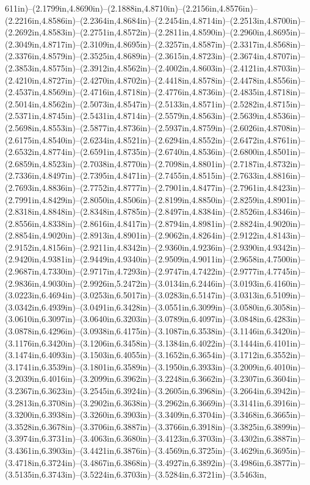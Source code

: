 611in)--(2.1799in,4.8690in)--(2.1888in,4.8710in)--(2.2156in,4.8576in)--(2.2216in,4.8586in)--(2.2364in,4.8684in)--(2.2454in,4.8714in)--(2.2513in,4.8700in)--(2.2692in,4.8583in)--(2.2751in,4.8572in)--(2.2811in,4.8590in)--(2.2960in,4.8695in)--(2.3049in,4.8717in)--(2.3109in,4.8695in)--(2.3257in,4.8587in)--(2.3317in,4.8568in)--(2.3376in,4.8579in)--(2.3525in,4.8689in)--(2.3615in,4.8723in)--(2.3674in,4.8707in)--(2.3853in,4.8575in)--(2.3912in,4.8562in)--(2.4002in,4.8603in)--(2.4121in,4.8703in)--(2.4210in,4.8727in)--(2.4270in,4.8702in)--(2.4418in,4.8578in)--(2.4478in,4.8556in)--(2.4537in,4.8569in)--(2.4716in,4.8718in)--(2.4776in,4.8736in)--(2.4835in,4.8718in)--(2.5014in,4.8562in)--(2.5073in,4.8547in)--(2.5133in,4.8571in)--(2.5282in,4.8715in)--(2.5371in,4.8745in)--(2.5431in,4.8714in)--(2.5579in,4.8563in)--(2.5639in,4.8536in)--(2.5698in,4.8553in)--(2.5877in,4.8736in)--(2.5937in,4.8759in)--(2.6026in,4.8708in)--(2.6175in,4.8540in)--(2.6234in,4.8521in)--(2.6294in,4.8552in)--(2.6472in,4.8761in)--(2.6532in,4.8774in)--(2.6591in,4.8735in)--(2.6740in,4.8536in)--(2.6800in,4.8501in)--(2.6859in,4.8523in)--(2.7038in,4.8770in)--(2.7098in,4.8801in)--(2.7187in,4.8732in)--(2.7336in,4.8497in)--(2.7395in,4.8471in)--(2.7455in,4.8515in)--(2.7633in,4.8816in)--(2.7693in,4.8836in)--(2.7752in,4.8777in)--(2.7901in,4.8477in)--(2.7961in,4.8423in)--(2.7991in,4.8429in)--(2.8050in,4.8506in)--(2.8199in,4.8850in)--(2.8259in,4.8901in)--(2.8318in,4.8848in)--(2.8348in,4.8785in)--(2.8497in,4.8384in)--(2.8526in,4.8346in)--(2.8556in,4.8338in)--(2.8616in,4.8417in)--(2.8794in,4.8981in)--(2.8824in,4.9020in)--(2.8854in,4.9020in)--(2.8913in,4.8901in)--(2.9062in,4.8264in)--(2.9122in,4.8143in)--(2.9152in,4.8156in)--(2.9211in,4.8342in)--(2.9360in,4.9236in)--(2.9390in,4.9342in)--(2.9420in,4.9381in)--(2.9449in,4.9340in)--(2.9509in,4.9011in)--(2.9658in,4.7500in)--(2.9687in,4.7330in)--(2.9717in,4.7293in)--(2.9747in,4.7422in)--(2.9777in,4.7745in)--(2.9836in,4.9030in)--(2.9926in,5.2472in)--(3.0134in,6.2446in)--(3.0193in,6.4160in)--(3.0223in,6.4694in)--(3.0253in,6.5017in)--(3.0283in,6.5147in)--(3.0313in,6.5109in)--(3.0342in,6.4939in)--(3.0491in,6.3428in)--(3.0551in,6.3099in)--(3.0580in,6.3058in)--(3.0610in,6.3097in)--(3.0640in,6.3203in)--(3.0789in,6.4097in)--(3.0848in,6.4283in)--(3.0878in,6.4296in)--(3.0938in,6.4175in)--(3.1087in,6.3538in)--(3.1146in,6.3420in)--(3.1176in,6.3420in)--(3.1206in,6.3458in)--(3.1384in,6.4022in)--(3.1444in,6.4101in)--(3.1474in,6.4093in)--(3.1503in,6.4055in)--(3.1652in,6.3654in)--(3.1712in,6.3552in)--(3.1741in,6.3539in)--(3.1801in,6.3589in)--(3.1950in,6.3933in)--(3.2009in,6.4010in)--(3.2039in,6.4016in)--(3.2099in,6.3962in)--(3.2248in,6.3662in)--(3.2307in,6.3604in)--(3.2367in,6.3623in)--(3.2545in,6.3924in)--(3.2605in,6.3968in)--(3.2664in,6.3942in)--(3.2813in,6.3708in)--(3.2902in,6.3638in)--(3.2962in,6.3669in)--(3.3141in,6.3916in)--(3.3200in,6.3938in)--(3.3260in,6.3903in)--(3.3409in,6.3704in)--(3.3468in,6.3665in)--(3.3528in,6.3678in)--(3.3706in,6.3887in)--(3.3766in,6.3918in)--(3.3825in,6.3899in)--(3.3974in,6.3731in)--(3.4063in,6.3680in)--(3.4123in,6.3703in)--(3.4302in,6.3887in)--(3.4361in,6.3903in)--(3.4421in,6.3876in)--(3.4569in,6.3725in)--(3.4629in,6.3695in)--(3.4718in,6.3724in)--(3.4867in,6.3868in)--(3.4927in,6.3892in)--(3.4986in,6.3877in)--(3.5135in,6.3743in)--(3.5224in,6.3703in)--(3.5284in,6.3721in)--(3.5463in,